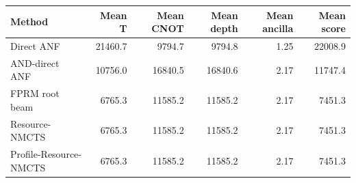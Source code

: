 \begin{tabular}{lrrrrr}
\toprule
Method & Mean T & Mean CNOT & Mean depth & Mean ancilla & Mean score \\
\midrule
Direct ANF & 21460.7 & 9794.7 & 9794.8 & 1.25 & 22008.9 \\
AND-direct ANF & 10756.0 & 16840.5 & 16840.6 & 2.17 & 11747.4 \\
FPRM root beam & 6765.3 & 11585.2 & 11585.2 & 2.17 & 7451.3 \\
Resource-NMCTS & 6765.3 & 11585.2 & 11585.2 & 2.17 & 7451.3 \\
Profile-Resource-NMCTS & 6765.3 & 11585.2 & 11585.2 & 2.17 & 7451.3 \\
\bottomrule
\end{tabular}
